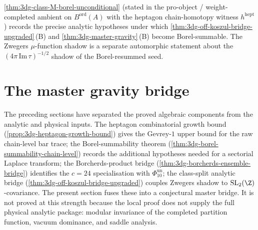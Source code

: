 \begin{remark}
\label{rem:3dg-class-split-unconditional-upgrade}%
%
\autoref{thm:3dg-class-M-borel-unconditional} (stated in the
pro-object / weight-completed ambient on $B^{\mathrm{ord}}(A)$ with
the heptagon chain-homotopy witness $h^{\mathrm{hept}}$) records the
precise analytic hypotheses under which
\autoref{thm:3dg-off-koszul-bridge-upgraded}\,\textup{(B)} and
\autoref{thm:3dg-master-gravity}\,\textup{(B)} become Borel-summable.
The Zwegers $\mu$-function shadow is a separate automorphic statement
about the $(4\pi\,\mathrm{Im}\,\tau)^{-1/2}$ shadow of the
Borel-resummed seed.
\end{remark}

\section{The master gravity bridge}
\label{sec:3dg-master-gravity-theorem}
%
%
%
%

The preceding sections have separated the proved algebraic components
from the analytic and physical inputs. The heptagon combinatorial
growth bound (\autoref{prop:3dg-heptagon-growth-bound}) gives the
Gevrey-$1$ upper bound for the raw chain-level bar trace; the
Borel-summability theorem
(\autoref{thm:3dg-borel-summability-chain-level}) records the
additional hypotheses needed for a sectorial Laplace transform; the
Borcherds-product bridge
(\autoref{thm:3dg-borcherds-ensemble-bridge}) identifies the
$c = 24$ specialisation with $\Phi_{10}^{\mathrm{un}}$; the class-split analytic bridge
(\autoref{thm:3dg-off-koszul-bridge-upgraded}) couples Zwegers
shadow to $\mathrm{SL}_{2}(\Z)$-covariance. The present section
fuses these into a conjectural master bridge. It is not proved at this strength
because the local proof does not supply the full physical analytic
package: modular invariance of the completed partition function,
vacuum dominance, and saddle analysis.

